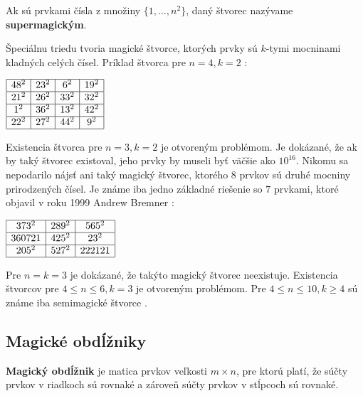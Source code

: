 \begin{definition} Ak sú prvkami čísla z množiny $\{1, \dots, n^2\}$, daný štvorec nazývame \textbf{supermagickým}.
\end{definition}

Špeciálnu triedu tvoria magické štvorce, ktorých prvky sú $k$-tymi mocninami kladných celých čísel. Príklad štvorca pre $n = 4, k = 2$ \cite{multimagie}:

\begin{center}
$\begin{array}{ |c|c|c|c| } 
\hline
48^2 & 23^2 & 6^2 & 19^2 \\ 
\hline
21^2 & 26^2 & 33^2 & 32^2 \\ 
\hline
1^2 & 36^2 & 13^2 & 42^2 \\
\hline
22^2 & 27^2 & 44^2 & 9^2 \\
\hline
\end{array}$
\end{center}

Existencia štvorca pre $n = 3, k = 2$ je otvoreným problémom. Je dokázané, že ak by taký štvorec existoval, jeho prvky by museli byť väčšie ako $10^{16}$. Nikomu sa nepodarilo nájsť ani taký magický štvorec, ktorého $8$ prvkov sú druhé mocniny prirodzených čísel. Je známe iba jedno základné riešenie so $7$ prvkami, ktoré objavil v roku 1999 Andrew Bremner \cite{multimagie}:

\begin{center}
$\begin{array}{ |c|c|c| } 
\hline
373^2 & 289^2 & 565^2 \\ 
\hline
360721 & 425^2 & 23^2 \\ 
\hline
205^2 & 527^2 & 222121 \\
\hline
\end{array}$
\end{center}

Pre $n = k = 3$ je dokázané, že takýto magický štvorec neexistuje. Existencia štvorcov pre $4 \leq n \leq 6, k = 3$ je otvoreným problémom. Pre $4 \leq n \leq 10, k \geq 4$ sú známe iba semimagické štvorce \cite{multimagie}.

\subsection{Magické obdĺžniky}
\begin{definition} \textbf{Magický obdĺžnik} je matica prvkov veľkosti $m \times n$, pre ktorú platí, že súčty prvkov v riadkoch sú rovnaké a zároveň súčty prvkov v stĺpcoch sú rovnaké.
\end{definition}

